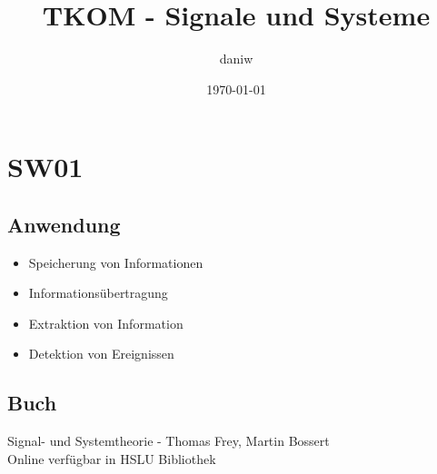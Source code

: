 \documentclass{article}
\title{TKOM - Signale und Systeme}
\author{daniw}
\date{\today}
\begin{document}
\maketitle

\clearpage

\section{SW01}
\subsection{Anwendung}
\begin{itemize}
    \item Speicherung von Informationen
    \item Informationsübertragung
    \item Extraktion von Information
    \item Detektion von Ereignissen
\end{itemize}
\subsection{Buch}
Signal- und Systemtheorie - Thomas Frey, Martin Bossert \\
Online verfügbar in HSLU Bibliothek
\end{document}
